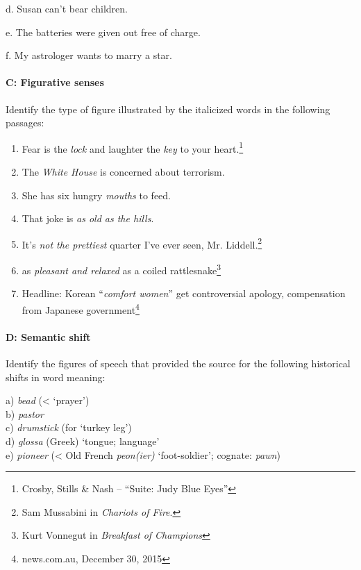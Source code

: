 \begin{stylepoints}
  d. Susan can’t bear children.
\end{stylepoints}

\begin{stylepoints}
  e. The batteries were given out free of charge.
\end{stylepoints}

\begin{stylepoints}
  f. My astrologer wants to marry a star.
\end{stylepoints}

\paragraph*{C: Figurative senses}

Identify the type of figure illustrated by the italicized words in the following passages:

\begin{enumerate}
\item Fear is the \textit{lock} and laughter the \textit{key} to your heart.\footnote{Crosby, Stills \& Nash – “Suite: Judy Blue Eyes”}
\item The \textit{White House} is concerned about terrorism.
\item She has six hungry \textit{mouths} to feed.
\item That joke is \textit{as old as the hills}.
\item It’s \textit{not the prettiest} quarter I’ve ever seen, Mr. Liddell.\footnote{Sam Mussabini in \textit{Chariots of Fire}.}
\item as \textit{pleasant and relaxed} as a coiled rattlesnake\footnote{Kurt Vonnegut in \textit{Breakfast of Champions}}
\item Headline: Korean “\textit{comfort women}” get controversial apology, compensation from Japanese government\footnote{news.com.au, December 30, 2015}
\end{enumerate}
\paragraph*{D: Semantic shift}

Identify the figures of speech that provided the source for the following historical shifts in word meaning:

\begin{stylepoints}
a) \textit{bead} (< ‘prayer’)\\
b) \textit{pastor}\\
c) \textit{drumstick} (for ‘turkey leg’)\\
d) \textit{glossa} (Greek) ‘tongue; language’\\
e) \textit{pioneer} (< Old French \textit{peon(ier)} ‘foot-soldier’; cognate: \textit{pawn})
\end{stylepoints}

